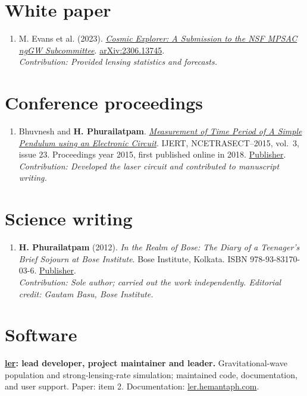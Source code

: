 \documentclass[10pt]{article}
\begin{document}
\section*{White paper}
\begin{enumerate}[start=15]
\item M. Evans et al. (2023). \href{https://arxiv.org/abs/2306.13745}{\textit{Cosmic Explorer: A Submission to the NSF MPSAC ngGW Subcommittee}}. \href{https://arxiv.org/abs/2306.13745}{arXiv:2306.13745}.\\\emph{Contribution: Provided lensing statistics and forecasts.}
\end{enumerate}
\section*{Conference proceedings}
\begin{enumerate}[start=16]
\item Bhuvnesh and \textbf{H. Phurailatpam}. \href{https://www.ijert.org/measurement-of-time-period-of-a-simple-pendulum-using-an-electronic-circuit}{\textit{Measurement of Time Period of A Simple Pendulum using an Electronic Circuit}}. IJERT, NCETRASECT--2015, vol.\ 3, issue 23. Proceedings year 2015, first published online in 2018. \href{https://www.ijert.org/measurement-of-time-period-of-a-simple-pendulum-using-an-electronic-circuit}{Publisher}.\\\emph{Contribution: Developed the laser circuit and contributed to manuscript writing.}
\end{enumerate}
\section*{Science writing}
\begin{enumerate}[start=17]
\item \textbf{H. Phurailatpam} (2012). \textit{In the Realm of Bose: The Diary of a Teenager's Brief Sojourn at Bose Institute}. Bose Institute, Kolkata. ISBN 978-93-83170-03-6. \href{https://jcbose.ac.in/publication}{Publisher}.\\\emph{Contribution: Sole author; carried out the work independently. Editorial credit: Gautam Basu, Bose Institute.}
\end{enumerate}
\section*{Software}
\textbf{\href{https://ler.hemantaph.com/}{ler}: lead developer, project maintainer and leader.} Gravitational-wave population and strong-lensing-rate simulation; maintained code, documentation, and user support. Paper: item 2. Documentation: \href{https://ler.hemantaph.com/}{ler.hemantaph.com}.
\end{document}
